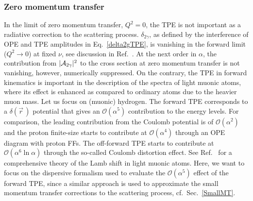 \subsubsection{Zero momentum transfer}
In the limit of zero momentum transfer, $Q^2=0$, the TPE is not important as a radiative correction to the scattering process. $\delta_{2\gamma}$, as defined by the interference of OPE and TPE amplitudes in Eq.~\ref{delta2gTPE}, is vanishing in the forward limit ($Q^2\rightarrow 0$) at fixed $\nu$, see discussion in Ref.~\cite{Tomalak:2018jak}. At the next order in $\alpha$, the contribution from $\vert {\mathcal A}_{2\gamma}\vert^2$ to the cross section at zero momentum transfer is not vanishing, however, numerically suppressed.
On the contrary, the TPE in forward kinematics is important in the description of the spectra of light muonic atoms, where its effect is enhanced as compared to ordinary atoms  due to the heavier muon mass. Let us focus on (muonic) hydrogen. The forward TPE corresponds to a $\delta(\vec{r}\,)$ potential that gives an $\mathcal{O}(\alpha^5)$ contribution to the energy levels. For comparison, the leading contribution from the Coulomb potential is of $\mathcal{O}(\alpha^2)$ and the proton finite-size starts to contribute at $\mathcal{O}(\alpha^4)$ through an OPE diagram with proton FFs. The off-forward TPE starts to contribute at $\mathcal{O}(\alpha^6\ln \alpha)$ through the so-called Coulomb distortion effect. See Ref.~\cite{Pachucki:2022tgl} for a comprehensive theory of the Lamb shift in light muonic atoms. Here, we want to focus on the dispersive formalism used to evaluate the $\mathcal{O}(\alpha^5)$ effect of the forward TPE, since a similar approach is used to approximate the small momentum transfer corrections to the scattering process, cf.\ Sec.~\ref{SmallMT}.
 
